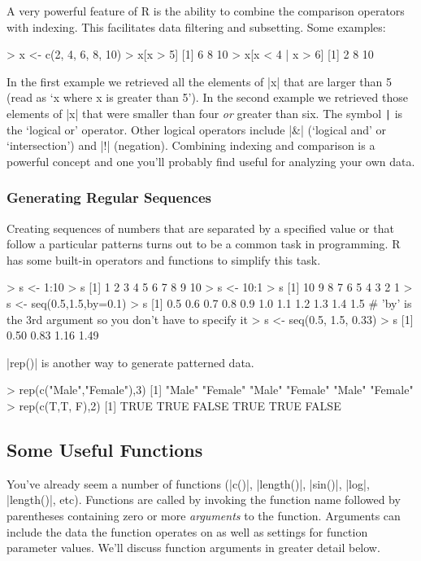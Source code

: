 A very powerful feature of R is the ability to combine the comparison
operators with indexing. This facilitates data filtering and subsetting.
Some examples:
%
\begin{R}
> x <- c(2, 4, 6, 8, 10)
> x[x > 5]
[1]  6  8 10
> x[x < 4 | x > 6]
[1]  2  8 10
\end{R}
%

In the first example we retrieved all the elements of |x| that are larger than
5 (read as `x where x is greater than 5'). In the second example we retrieved
those elements of |x| that were smaller than four \emph{or} greater than six.
The symbol \lstinline!|! is the `logical or' operator. Other logical operators
include |&| (`logical and' or `intersection') and |!| (negation). Combining
indexing and comparison is a powerful concept and one you'll probably find
useful for analyzing your own data.

\subsubsection{Generating Regular Sequences}

Creating sequences of numbers that are separated by a specified value or
that follow a particular patterns turns out to be a common task in
programming. R has some built-in operators and functions to simplify
this task.
%
\begin{R}
> s <- 1:10
> s
 [1]  1  2  3  4  5  6  7  8  9 10
> s <- 10:1
> s
 [1] 10  9  8  7  6  5  4  3  2  1
> s <- seq(0.5,1.5,by=0.1)
> s
 [1] 0.5 0.6 0.7 0.8 0.9 1.0 1.1 1.2 1.3 1.4 1.5
# 'by' is the 3rd argument so you don't have to specify it
> s <- seq(0.5, 1.5, 0.33)
> s
[1] 0.50 0.83 1.16 1.49
\end{R}

|rep()| is another way to generate patterned data.
%
\begin{R}
> rep(c("Male","Female"),3)
[1] "Male"   "Female" "Male"   "Female" "Male"   "Female"
> rep(c(T,T, F),2)
[1]  TRUE  TRUE FALSE  TRUE  TRUE FALSE
\end{R}


\subsection{Some Useful Functions}

You've already seem a number of functions (|c()|, |length()|, |sin()|,
|log|, |length()|, etc). Functions are called by
invoking the function name followed by parentheses containing zero or
more \emph{arguments} to the function. Arguments can include the data
the function operates on as well as settings for function parameter
values. We'll discuss function arguments in greater detail below.

